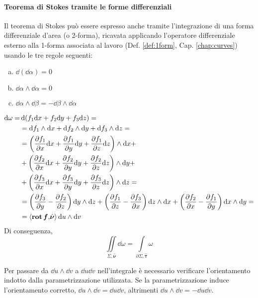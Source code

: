 \paragraph{Teorema di Stokes tramite le forme differenziali}

Il teorema di Stokes può essere espresso anche tramite l'integrazione di una forma differenziale d'area (o 2-forma), ricavata applicando l'operatore differenziale esterno alla 1-forma associata al lavoro (Def. \ref{def:1form}, Cap. \ref{chap:curves}) usando le tre regole seguenti:
\begin{enumerate}[a.]
	\item $\dd(\dd \alpha)=0$
	\item $\dd \alpha \wedge \dd \alpha=0$
	\item $\dd \alpha \wedge \dd \beta = -\dd \beta \wedge \dd \alpha$
\end{enumerate}
\begin{align*}
	\dd \omega =& \dd (f_1 \dd x+f_2 \dd y+f_3 \dd z)=\\
	&=\dd f_1\wedge \dd x +\dd f_2 \wedge \dd y +\dd f_3 \wedge \dd z=\\
	&=\left( \frac{\partial f_1}{\partial x}\dd x + \frac{\partial f_1}{\partial y}\dd y + \frac{\partial f_1}{\partial z}\dd z \right)\wedge \dd x+\\
	&+\left( \frac{\partial f_2}{\partial x}\dd x + \frac{\partial f_2}{\partial y}\dd y + \frac{\partial f_2}{\partial z}\dd z \right)\wedge \dd y +\\ 
	&+\left(\frac{\partial f_3}{\partial x}\dd x + \frac{\partial f_3}{\partial y}\dd y + \frac{\partial f_3}{\partial z}\dd z\right) \wedge \dd z= \\
	&=\left(\frac{\partial f_3}{\partial y}-\frac{\partial f_2}{\partial z}\right)\dd y \wedge \dd z+
	\left(\frac{\partial f_1}{\partial z}-\frac{\partial f_3}{\partial x}\right)\dd z \wedge \dd x+
	\left(\frac{\partial f_2}{\partial x}-\frac{\partial f_1}{\partial y}\right)\dd x \wedge \dd y
	=\\
	&=\left\langle\operatorname{\vb{rot}} \bm f{,}\hat{\bm \nu}\right\rangle \dd u \wedge \dd v
\end{align*}
Di conseguenza,
$$
	\iint\limits_{\Sigma,\hat{\bm \nu}} \dd \omega = \int\limits_{\partial \Sigma,\hat{\bm \tau}} \omega
$$

\begin{remark}
	Per passare da $\dd u \wedge \dd v$ a $\dd u \dd v$ nell'integrale è necessario verificare l'orientamento indotto dalla parametrizzazione utilizzata. Se la parametrizzazione induce l'orientamento corretto, $\dd u \wedge \dd v = \dd u \dd v$, altrimenti $\dd u \wedge \dd v= -\dd u \dd v$.  
\end{remark}

